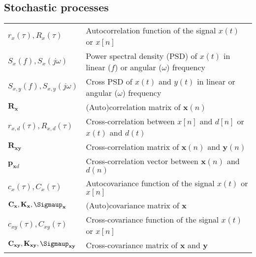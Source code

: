 \documentclass{article}
\begin{document}
\subsection{Stochastic processes}
\begin{xltabular}{\textwidth}{XX}
    \(r_x(\tau), R_x(\tau)\) & Autocorrelation function of the signal \(x(t)\) or \(x[n]\)\\
    \(S_x(f), S_x(j\omega)\) & Power spectral density (PSD) of \(x(t)\) in linear (\(f\)) or angular (\(\omega\)) frequency\\
    \(S_{x,y}(f), S_{x,y}(j\omega)\) & Cross PSD of \(x(t)\) and \(y(t)\) in linear or angular (\(\omega\)) frequency\\
    \(\mathbf{R}_\mathbf{x}\) & (Auto)correlation matrix of \(\mathbf{x}(n)\) \\
    \(r_{x,d}(\tau), R_{x,d}(\tau)\) & Cross-correlation between \(x[n]\) and \(d[n]\) or \(x(t)\) and \(d(t)\)\\
    \(\mathbf{R}_\mathbf{xy}\) & Cross-correlation matrix of \(\mathbf{x}(n)\) and \(\mathbf{y}(n)\)\\
    \(\mathbf{p}_{\mathbf{x}d}\)& Cross-correlation vector between \(\mathbf{x}(n)\) and \(d(n)\) \\
    \(c_x(\tau), C_x(\tau)\) & Autocovariance function of the signal \(x(t)\) or \(x[n]\)\\
    \(\mathbf{C}_\mathbf{x}, \mathbf{K}_\mathbf{x}, \boldsymbol{\Sigmaup}_\mathbf{x}\) & (Auto)covariance matrix of \(\mathbf{x}\) \\
    \(c_{xy}(\tau), C_{xy}(\tau)\) & Cross-covariance function of the signal \(x(t)\) or \(x[n]\)\\
    \(\mathbf{C}_{\mathbf{xy}}, \mathbf{K}_{\mathbf{xy}}, \boldsymbol{\Sigmaup}_{\mathbf{xy}}\) & Cross-covariance matrix of \(\mathbf{x}\) and \(\mathbf{y}\)
\end{xltabular}
\end{document}
